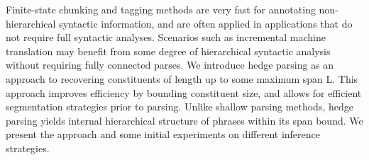 Finite-state chunking and tagging methods are very fast for annotating non-hierarchical syntactic information, and are often applied in applications that do not require full syntactic analyses.  Scenarios such as incremental machine translation may benefit from some degree of hierarchical syntactic analysis without requiring fully connected parses.  We introduce hedge parsing as an approach to recovering constituents of length up to some maximum span L. This approach improves efficiency by bounding constituent size, and allows for efficient segmentation strategies prior to parsing.  Unlike shallow parsing methods, hedge parsing yields internal hierarchical structure of phrases within its span bound.  We present the approach and some initial experiments on different inference strategies.
